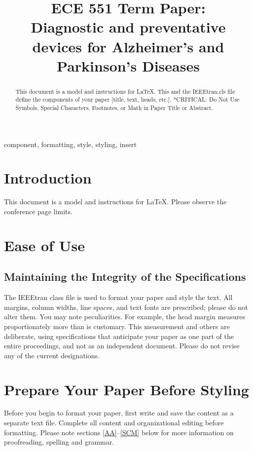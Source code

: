 \documentclass[conference]{IEEEtran}
\begin{document}
	
	\title{ECE 551 Term Paper:\\Diagnostic and preventative devices for Alzheimer’s and Parkinson’s Diseases
	}
	
	\author{
	}
	
	\maketitle
	
	\begin{abstract}
		This document is a model and instructions for \LaTeX.
		This and the IEEEtran.cls file define the components of your paper [title, text, heads, etc.]. *CRITICAL: Do Not Use Symbols, Special Characters, Footnotes, 
		or Math in Paper Title or Abstract.
	\end{abstract}
	
	\begin{IEEEkeywords}
		component, formatting, style, styling, insert
	\end{IEEEkeywords}
	
	\section{Introduction}
	This document is a model and instructions for \LaTeX.
	Please observe the conference page limits. 
	
	\section{Ease of Use}
	
	\subsection{Maintaining the Integrity of the Specifications}
	
	The IEEEtran class file is used to format your paper and style the text. All margins, 
	column widths, line spaces, and text fonts are prescribed; please do not 
	alter them. You may note peculiarities. For example, the head margin
	measures proportionately more than is customary. This measurement 
	and others are deliberate, using specifications that anticipate your paper 
	as one part of the entire proceedings, and not as an independent document. 
	Please do not revise any of the current designations.
	
	\section{Prepare Your Paper Before Styling}
	Before you begin to format your paper, first write and save the content as a 
	separate text file. Complete all content and organizational editing before 
	formatting. Please note sections \ref{AA}--\ref{SCM} below for more information on 
	proofreading, spelling and grammar.
	
\end{document}
